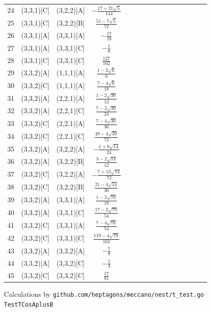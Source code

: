 \documentclass[11pt]{article}
\begin{document}
\begin{longtable}{ | p{1cm}| *{15}{c|} }
24 & (3,3,1)[C] & (3,2,2)[A] & $-\frac{17+21\sqrt{5}}{144}$\\ %
25 & (3,3,1)[C] & (3,2,2)[B] & $\frac{51-7\sqrt{5}}{72}$\\ %
26 & (3,3,1)[A] & (3,3,1)[A] & $-\frac{17}{18}$\\ %
27 & (3,3,1)[A] & (3,3,1)[C] & $-\frac{1}{6}$\\ %
28 & (3,3,1)[C] & (3,3,1)[C] & $\frac{127}{162}$\\ %
29 & (3,3,2)[A] & (1,1,1)[A] & $\frac{1-2\sqrt{6}}{6}$\\ %
30 & (3,3,2)[C] & (1,1,1)[A] & $\frac{7-4\sqrt{6}}{18}$\\ %
31 & (3,3,2)[A] & (2,2,1)[A] & $\frac{1-2\sqrt{30}}{12}$\\ %
32 & (3,3,2)[A] & (2,2,1)[C] & $\frac{7-2\sqrt{30}}{24}$\\ %
33 & (3,3,2)[C] & (2,2,1)[A] & $\frac{7-4\sqrt{30}}{36}$\\ %
34 & (3,3,2)[C] & (2,2,1)[C] & $\frac{49-4\sqrt{30}}{72}$\\ %
35 & (3,3,2)[A] & (3,2,2)[A] & $-\frac{1+6\sqrt{14}}{24}$\\ %
36 & (3,3,2)[A] & (3,2,2)[B] & $\frac{3-2\sqrt{14}}{12}$\\ %
37 & (3,3,2)[C] & (3,2,2)[A] & $-\frac{7+12\sqrt{14}}{72}$\\ %
38 & (3,3,2)[C] & (3,2,2)[B] & $\frac{21-4\sqrt{14}}{36}$\\ %
39 & (3,3,2)[A] & (3,3,1)[A] & $\frac{1-2\sqrt{70}}{18}$\\ %
40 & (3,3,2)[A] & (3,3,1)[C] & $\frac{17-2\sqrt{70}}{54}$\\ %
41 & (3,3,2)[C] & (3,3,1)[A] & $\frac{7-4\sqrt{70}}{54}$\\ %
42 & (3,3,2)[C] & (3,3,1)[C] & $\frac{119-4\sqrt{70}}{162}$\\ %
43 & (3,3,2)[A] & (3,3,2)[A] & $-\frac{7}{9}$\\ %
44 & (3,3,2)[A] & (3,3,2)[C] & $-\frac{1}{3}$\\ %
45 & (3,3,2)[C] & (3,3,2)[C] & $\frac{17}{81}$\\ %
\end{longtable}
Calculations by \texttt{github.com/heptagons/meccano/nest/t\_test.go TestTCosAplusB}
\end{document}

